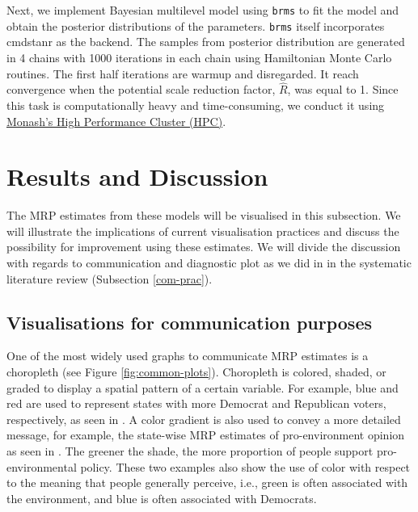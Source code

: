 \documentclass{monashthesis}
\begin{document}
Next, we implement Bayesian multilevel model using \texttt{brms} \autocite{brms} to fit the model and obtain the posterior distributions of the parameters. \texttt{brms} itself incorporates cmdstanr \autocite{cmdstanr} as the backend. The samples from posterior distribution are generated in 4 chains with 1000 iterations in each chain using Hamiltonian Monte Carlo routines. The first half iterations are warmup and disregarded. It reach convergence when the potential scale reduction factor, \(\hat{R}\), was equal to 1. Since this task is computationally heavy and time-consuming, we conduct it using \href{https://docs.monarch.erc.monash.edu/MonARCH/aboutMonArch.html}{Monash's High Performance Cluster (HPC)}.

\hypertarget{results-and-discussion}{%
\section{Results and Discussion}\label{results-and-discussion}}

The MRP estimates from these models will be visualised in this subsection. We will illustrate the implications of current visualisation practices and discuss the possibility for improvement using these estimates. We will divide the discussion with regards to communication and diagnostic plot as we did in in the systematic literature review (Subsection \ref{com-prac}).

\hypertarget{visualisations-for-communication-purposes}{%
\subsection{Visualisations for communication purposes}\label{visualisations-for-communication-purposes}}

One of the most widely used graphs to communicate MRP estimates is a choropleth (see Figure \ref{fig:common-plots}). Choropleth is colored, shaded, or graded to display a spatial pattern of a certain variable. For example, blue and red are used to represent states with more Democrat and Republican voters, respectively, as seen in \textcite{GhitzaYair2013DIwM}. A color gradient is also used to convey a more detailed message, for example, the state-wise MRP estimates of pro-environment opinion as seen in \textcite{EunKimSung2018Epoi}. The greener the shade, the more proportion of people support pro-environmental policy. These two examples also show the use of color with respect to the meaning that people generally perceive, i.e., green is often associated with the environment, and blue is often associated with Democrats.
\end{document}
